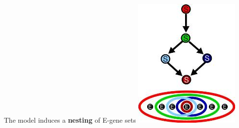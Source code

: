 \documentclass{beamer}
\begin{document}
\begin{frame}{The model induces a \textbf{nesting} of E-gene sets}
\centering
\includegraphics{NestedEffects.jpg}
\end{frame}
\end{document}
